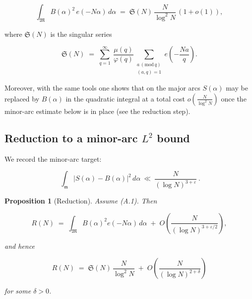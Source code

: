 \documentclass[11pt]{article}
\newtheorem{proposition}[lemma]{Proposition}
\theoremstyle{definition}
\theoremstyle{remark}
\begin{document}
$$
\int_{\mathfrak M} B(\alpha)^2\,e(-N\alpha)\,d\alpha
\;=\;\mathfrak S(N)\,\frac{N}{\log^2 N}\,(1+o(1)),
$$

where $\mathfrak S(N)$ is the singular series

$$
\mathfrak S(N)\;=\;\sum_{q=1}^{\infty}\ \frac{\mu(q)}{\varphi(q)}\!
\sum_{\substack{a\,(\mathrm{mod}\,q)\\(a,q)=1}} e\!\left(-\frac{Na}{q}\right).
$$

Moreover, with the same tools one shows that on the major arcs $S(\alpha)$ may be replaced by $B(\alpha)$ in the quadratic integral at a total cost $o\!\left(\tfrac{N}{\log^2 N}\right)$ once the minor-arc estimate below is in place (see the reduction step).


\subsection*{Reduction to a minor-arc $L^2$ bound}

We record the minor-arc target:

\begin{equation}
\boxed{\ \ \int_{\mathfrak m}\!\bigl|S(\alpha)-B(\alpha)\bigr|^{2}\,d\alpha
\ \ll\ \frac{N}{(\log N)^{3+\varepsilon}}\ .\ }
\tag{A.1}
\end{equation}

\begin{proposition}[Reduction]\label{prop:reduction}
Assume (A.1). Then

$$
R(N)\;=\;\int_{\mathfrak M} B(\alpha)^2 e(-N\alpha)\,d\alpha\;+\;O\!\left(\frac{N}{(\log N)^{3+\varepsilon/2}}\right),
$$

and hence

$$
R(N)\;=\;\mathfrak S(N)\,\frac{N}{\log^{2}N}\;+\;O\!\left(\frac{N}{(\log N)^{2+\delta}}\right)
$$

for some $\delta>0$.

\end{proposition}
\end{document}
